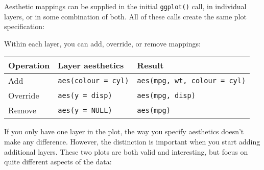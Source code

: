 Aesthetic mappings can be supplied in the initial \texttt{ggplot()}
call, in individual layers, or in some combination of both. All of these
calls create the same plot specification:

\begin{Shaded}
\begin{Highlighting}[]
\OperatorTok{+}\StringTok{ }
\StringTok{  }\NormalTok{()}
\OperatorTok{+}\StringTok{ }
\StringTok{  }\NormalTok{(}\NormalTok{(}
\OperatorTok{+}\StringTok{ }
\StringTok{  }\NormalTok{(}\NormalTok{(}
\OperatorTok{+}\StringTok{ }
\StringTok{  }\NormalTok{(}
\end{Highlighting}
\end{Shaded}

Within each layer, you can add, override, or remove mappings:

\begin{longtable}[]{@{}lll@{}}
\toprule
Operation & Layer aesthetics & Result\tabularnewline
\midrule
\endhead
Add & \texttt{aes(colour\ =\ cyl)} &
\texttt{aes(mpg,\ wt,\ colour\ =\ cyl)}\tabularnewline
Override & \texttt{aes(y\ =\ disp)} &
\texttt{aes(mpg,\ disp)}\tabularnewline
Remove & \texttt{aes(y\ =\ NULL)} & \texttt{aes(mpg)}\tabularnewline
\bottomrule
\end{longtable}

If you only have one layer in the plot, the way you specify aesthetics
doesn't make any difference. However, the distinction is important when
you start adding additional layers. These two plots are both valid and
interesting, but focus on quite different aspects of the data:

